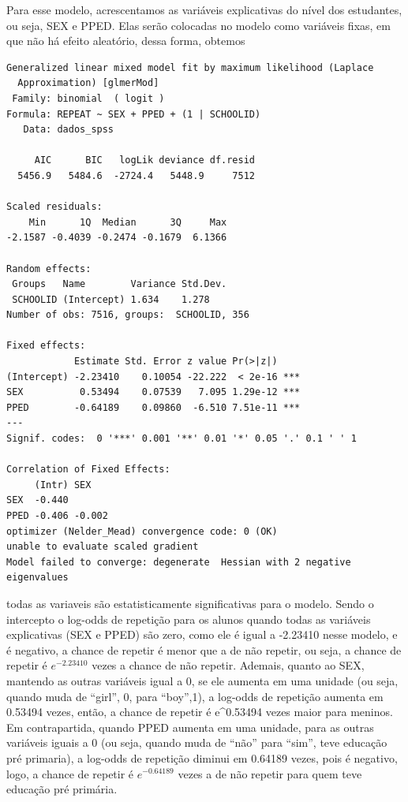 \documentclass[
  letterpaper,
  DIV=11,
  numbers=noendperiod]{scrartcl}
\begin{document}
Para esse modelo, acrescentamos as variáveis explicativas do nível dos
estudantes, ou seja, SEX e PPED. Elas serão colocadas no modelo como
variáveis fixas, em que não há efeito aleatório, dessa forma, obtemos

\begin{verbatim}
Generalized linear mixed model fit by maximum likelihood (Laplace
  Approximation) [glmerMod]
 Family: binomial  ( logit )
Formula: REPEAT ~ SEX + PPED + (1 | SCHOOLID)
   Data: dados_spss

     AIC      BIC   logLik deviance df.resid 
  5456.9   5484.6  -2724.4   5448.9     7512 

Scaled residuals: 
    Min      1Q  Median      3Q     Max 
-2.1587 -0.4039 -0.2474 -0.1679  6.1366 

Random effects:
 Groups   Name        Variance Std.Dev.
 SCHOOLID (Intercept) 1.634    1.278   
Number of obs: 7516, groups:  SCHOOLID, 356

Fixed effects:
            Estimate Std. Error z value Pr(>|z|)    
(Intercept) -2.23410    0.10054 -22.222  < 2e-16 ***
SEX          0.53494    0.07539   7.095 1.29e-12 ***
PPED        -0.64189    0.09860  -6.510 7.51e-11 ***
---
Signif. codes:  0 '***' 0.001 '**' 0.01 '*' 0.05 '.' 0.1 ' ' 1

Correlation of Fixed Effects:
     (Intr) SEX   
SEX  -0.440       
PPED -0.406 -0.002
optimizer (Nelder_Mead) convergence code: 0 (OK)
unable to evaluate scaled gradient
Model failed to converge: degenerate  Hessian with 2 negative eigenvalues
\end{verbatim}

todas as variaveis são estatisticamente significativas para o modelo.
Sendo o intercepto o log-odds de repetição para os alunos quando todas
as variáveis explicativas (SEX e PPED) são zero, como ele é igual a
-2.23410 nesse modelo, e é negativo, a chance de repetir é menor que a
de não repetir, ou seja, a chance de repetir é \(e^{-2.23410}\) vezes a
chance de não repetir. Ademais, quanto ao SEX, mantendo as outras
variáveis igual a 0, se ele aumenta em uma unidade (ou seja, quando muda
de ``girl'', 0, para ``boy'',1), a log-odds de repetição aumenta em
0.53494 vezes, então, a chance de repetir é e\^{}0.53494 vezes maior
para meninos. Em contrapartida, quando PPED aumenta em uma unidade, para
as outras variáveis iguais a 0 (ou seja, quando muda de ``não'' para
``sim'', teve educação pré primaria), a log-odds de repetição diminui em
0.64189 vezes, pois é negativo, logo, a chance de repetir é
\(e^{-0.64189}\) vezes a de não repetir para quem teve educação pré
primária.
\end{document}
